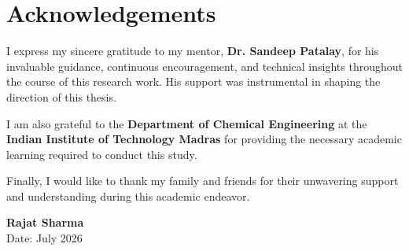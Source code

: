\chapter*{Acknowledgements}

I express my sincere gratitude to my mentor, \textbf{Dr. Sandeep Patalay}, for his invaluable guidance, continuous encouragement, and technical insights throughout the course of this research work. His support was instrumental in shaping the direction of this thesis.

I am also grateful to the \textbf{Department of Chemical Engineering} at the \textbf{Indian Institute of Technology Madras} for providing the necessary academic learning required to conduct this study.

Finally, I would like to thank my family and friends for their unwavering support and understanding during this academic endeavor.

\vspace{2cm}
\noindent
\textbf{Rajat Sharma} \\
Date: July 2026